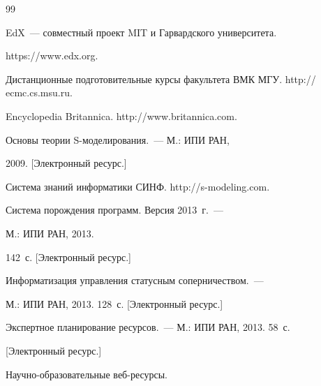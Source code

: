 {\small\frenchspacing


{%




\begin{thebibliography}{99}




EdX~--- совместный проект MIT и Гарвардского университета.


{\sf https://www.edx.org}.




Дистанционные подготовительные курсы факультета ВМК МГУ. {\sf http:// ecmc.cs.msu.ru}.




Encyclopedia Britannica. {\sf http://www.britannica.com}.




 Основы теории S-мо\-де\-ли\-ро\-ва\-ния.~--- М.: ИПИ РАН,


2009. [Электронный ресурс.]




Система знаний информатики СИНФ. {\sf http://s-modeling.com}.




 Система порождения программ. Версия 2013~г.~---


М.: ИПИ РАН, 2013.


142~с. [Электронный ресурс.] %




 Информатизация управления статусным соперничеством.~---


М.: ИПИ РАН, 2013. 128~с.  [Электронный ресурс.] %




 Экспертное планирование ресурсов.~--- М.: ИПИ РАН, 2013. 58~с.




[Электронный ресурс.] %




 Научно-образовательные веб-ре\-сур\-сы.



\end{thebibliography}}}
